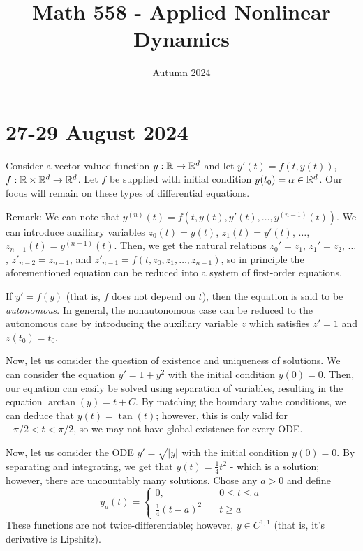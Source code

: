 \documentclass{article}
\title{Math 558 - Applied Nonlinear Dynamics}
\author{Autumn 2024}
\begin{document}
   
\maketitle
\frenchspacing

\section*{27-29 August 2024}
Consider a vector-valued function $y: \mathbb{R} \to \mathbb{R}^d$ and let $y'(t) = f(t, y(t))$, $f : \mathbb{R} \times \mathbb{R}^d \to \mathbb{R}^d$. Let $f$ be supplied with initial condition $y(t_0) = \alpha \in \mathbb{R}^d$. Our focus will remain on these types of differential equations.

\newpar
Remark: We can note that $y^{(n)}(t) = f(t, y(t), y'(t), \hdots, y^{(n - 1)}(t))$. We can introduce auxiliary variables $z_0(t) = y(t)$, $z_1(t) = y'(t)$, $\hdots$, $z_{n - 1}(t) = y^{(n - 1)}(t)$. Then, we get the natural relations $z_0' = z_1$, $z_1' = z_2$, $\hdots$, $z'_{n - 2} = z_{n - 1}$, and $z'_{n - 1} = f(t, z_0, z_1, \hdots, z_{n - 1})$, so in principle the aforementioned equation can be reduced into a system of first-order equations. 

\newpar
If $y' = f(y)$ (that is, $f$ does not depend on $t$), then the equation is said to be \textit{autonomous}. In general, the nonautonomous case can be reduced to the autonomous case by introducing the auxiliary variable $z$ which satisfies $z' = 1$ and $z(t_0) = t_0$. 

\newpar 
Now, let us consider the question of existence and uniqueness of solutions. We can consider the equation $y' = 1+ y^2$ with the initial condition $y(0) = 0$. Then, our equation can easily be solved using separation of variables, resulting in the equation $\arctan(y) = t + C$. By matching the boundary value conditions, we can deduce that $y(t) = \tan(t)$; however, this is only valid for $-\pi/2 < t < \pi/2$, so we may not have global existence for every ODE. 
\newpar

Now, let us consider the ODE $y' = \sqrt{|y|}$ with the initial condition $y(0) = 0$. By separating and integrating, we get that $y(t) = \frac{1}{4} t^2$ - which is a solution; however, there are uncountably many solutions. Chose any $a > 0$ and define 
    \[
        y_a(t) = 
        \begin{cases}
            0, \quad& 0 \leq t \leq a \\
            \displaystyle\frac{1}{4}(t - a)^2 \quad& t \geq a
        \end{cases}
    \]
These functions are not twice-differentiable; however, $y \in C^{1, 1}$ (that is, it's derivative is Lipshitz). 
\end{document}
